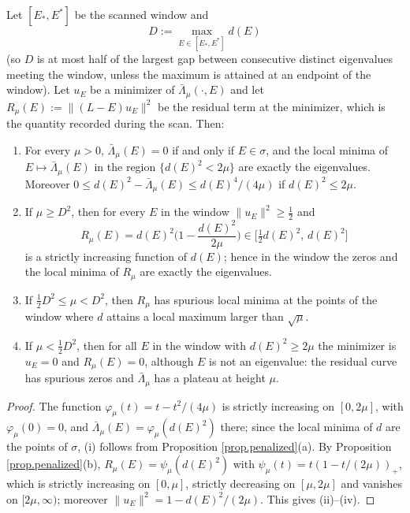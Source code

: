 \begin{corollary}\label{cor.mu}
Let $[E_*,E^*]$ be the scanned window and
\[
D:=\max_{E\in[E_*,E^*]}d(E)
\]
(so $D$ is at most half of the largest gap between consecutive distinct eigenvalues
meeting the window, unless the maximum is attained at an endpoint of the window). Let
$u_E$ be a minimizer of $\bar\Lambda_\mu(\cdot,E)$ and let
$R_\mu(E):=\|(L-E)u_E\|^2$ be the residual term at the minimizer, which is the quantity
recorded during the scan. Then:
\begin{enumerate}
\item[(i)] For every $\mu>0$, $\bar\Lambda_\mu(E)=0$ if and only if $E\in\sigma$, and the
local minima of $E\mapsto\bar\Lambda_\mu(E)$ in the region $\{d(E)^2<2\mu\}$ are exactly
the eigenvalues. Moreover
$0\le d(E)^2-\bar\Lambda_\mu(E)\le d(E)^4/(4\mu)$ if $d(E)^2\le2\mu$.
\item[(ii)] If $\mu\ge D^2$, then for every $E$ in the window $\|u_E\|^2\ge\frac12$ and
\[
R_\mu(E)=d(E)^2\Big(1-\frac{d(E)^2}{2\mu}\Big)\in\big[\tfrac12 d(E)^2,\,d(E)^2\big]
\]
is a strictly increasing function of $d(E)$; hence in the window the zeros and the local
minima of $R_\mu$ are exactly the eigenvalues.
\item[(iii)] If $\frac12D^2\le\mu<D^2$, then $R_\mu$ has spurious local minima at the points of the window where $d$ attains a local maximum larger than
$\sqrt\mu$.
\item[(iv)] If $\mu<\frac12D^2$, then for all $E$ in the window with $d(E)^2\ge2\mu$ the
minimizer is $u_E=0$ and $R_\mu(E)=0$, although $E$ is not an eigenvalue: the residual
curve has spurious zeros and $\bar\Lambda_\mu$ has a plateau at height $\mu$.
\end{enumerate}
\end{corollary}

\begin{proof}
The function $\varphi_\mu(t)=t-t^2/(4\mu)$ is strictly increasing on $[0,2\mu]$, with
$\varphi_\mu(0)=0$, and $\bar\Lambda_\mu(E)=\varphi_\mu(d(E)^2)$ there; since the local
minima of $d$ are the points of $\sigma$, (i) follows from Proposition
\ref{prop.penalized}(a). By Proposition \ref{prop.penalized}(b),
$R_\mu(E)=\psi_\mu(d(E)^2)$ with $\psi_\mu(t)=t(1-t/(2\mu))_+$, which is strictly
increasing on $[0,\mu]$, strictly decreasing on $[\mu,2\mu]$ and vanishes on
$[2\mu,\infty)$; moreover $\|u_E\|^2=1-d(E)^2/(2\mu)$. This gives (ii)--(iv).
\end{proof}

